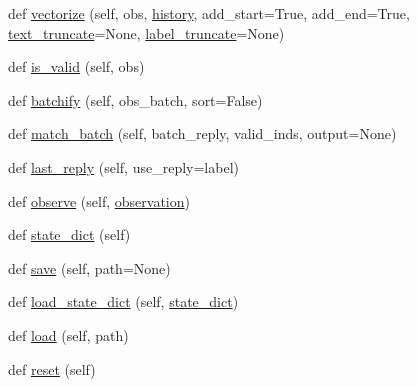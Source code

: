 \begin{DoxyCompactItemize}
def \hyperlink{classparlai_1_1core_1_1torch__agent_1_1TorchAgent_a48bb9b153353a0565ab7253dc1daef99}{vectorize} (self, obs, \hyperlink{classparlai_1_1core_1_1torch__agent_1_1TorchAgent_a0484b0246f0a930adc575899cdef033c}{history}, add\+\_\+start=True, add\+\_\+end=True, \hyperlink{classparlai_1_1core_1_1torch__agent_1_1TorchAgent_ae3a69ecb5f20ce4f8a09c05c5f6f4376}{text\+\_\+truncate}=None, \hyperlink{classparlai_1_1core_1_1torch__agent_1_1TorchAgent_adbdd7cf2deb2c43d982c57852b83e685}{label\+\_\+truncate}=None)
\item 
def \hyperlink{classparlai_1_1core_1_1torch__agent_1_1TorchAgent_afa491bf2384b017711ad722b5341b405}{is\+\_\+valid} (self, obs)
\item 
def \hyperlink{classparlai_1_1core_1_1torch__agent_1_1TorchAgent_a4c5824776df0c6cf995984a5e7a3f433}{batchify} (self, obs\+\_\+batch, sort=False)
\item 
def \hyperlink{classparlai_1_1core_1_1torch__agent_1_1TorchAgent_aba56b961d929e5c5b5da9cf8bd331502}{match\+\_\+batch} (self, batch\+\_\+reply, valid\+\_\+inds, output=None)
\item 
def \hyperlink{classparlai_1_1core_1_1torch__agent_1_1TorchAgent_a32921aa09a682ee752d4822a5f5ebbb4}{last\+\_\+reply} (self, use\+\_\+reply=\textquotesingle{}label\textquotesingle{})
\item 
def \hyperlink{classparlai_1_1core_1_1torch__agent_1_1TorchAgent_a87b18f0d6ab11be3c49375af072d0d33}{observe} (self, \hyperlink{classparlai_1_1core_1_1torch__agent_1_1TorchAgent_a4bc525b20568822a042b3bbfa3da3a69}{observation})
\item 
def \hyperlink{classparlai_1_1core_1_1torch__agent_1_1TorchAgent_a9f89e606931a4622a5c6a6f6b832235c}{state\+\_\+dict} (self)
\item 
def \hyperlink{classparlai_1_1core_1_1torch__agent_1_1TorchAgent_adac7ee3db855786e8414e9f35fcb6e46}{save} (self, path=None)
\item 
def \hyperlink{classparlai_1_1core_1_1torch__agent_1_1TorchAgent_a5dcfca62a677f8de97f09ce993258f84}{load\+\_\+state\+\_\+dict} (self, \hyperlink{classparlai_1_1core_1_1torch__agent_1_1TorchAgent_a9f89e606931a4622a5c6a6f6b832235c}{state\+\_\+dict})
\item 
def \hyperlink{classparlai_1_1core_1_1torch__agent_1_1TorchAgent_af626fc7d32fc9b0dfeec167a52353baf}{load} (self, path)
\item 
def \hyperlink{classparlai_1_1core_1_1torch__agent_1_1TorchAgent_a6f568650dd8e245a274671680ebb7587}{reset} (self)
\item 

\end{DoxyCompactItemize}
